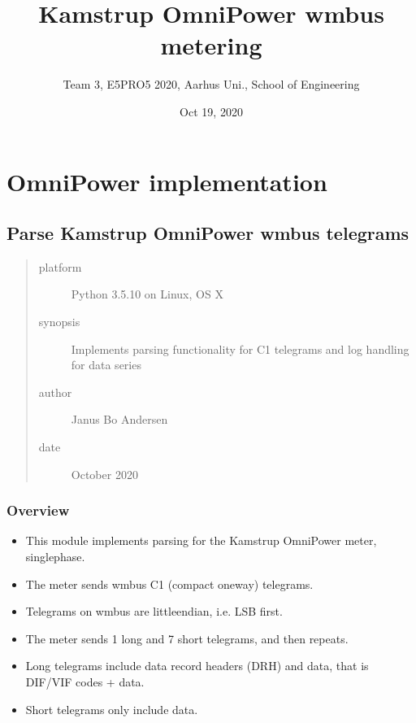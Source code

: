 \documentclass[letterpaper,10pt,english]{sphinxmanual}
\title{Kamstrup OmniPower wm\sphinxhyphen{}bus metering}
\date{Oct 19, 2020}
\author{Team 3, E5PRO5 2020, Aarhus Uni., School of Engineering}
\begin{document}
\pagestyle{empty}
\sphinxmaketitle
\pagestyle{plain}
\sphinxtableofcontents
\pagestyle{normal}
\label{\detokenize{index::doc}}



\chapter{OmniPower implementation}
\label{\detokenize{omnipower:module-OmniPower.OmniPower}}\label{\detokenize{omnipower:omnipower-implementation}}\label{\detokenize{omnipower::doc}}

\section{Parse Kamstrup OmniPower wm\sphinxhyphen{}bus telegrams}
\label{\detokenize{omnipower:parse-kamstrup-omnipower-wm-bus-telegrams}}\begin{quote}\begin{description}
\item[{platform}] \leavevmode
Python 3.5.10 on Linux, OS X

\item[{synopsis}] \leavevmode
Implements parsing functionality for C1 telegrams and log handling for data series

\item[{author}] \leavevmode
Janus Bo Andersen

\item[{date}]  October 2020

\end{description}\end{quote}


\subsection{Overview}
\label{\detokenize{omnipower:overview}}\begin{itemize}
\item {} 
This module implements parsing for the Kamstrup OmniPower meter, single\sphinxhyphen{}phase.

\item {} 
The meter sends wm\sphinxhyphen{}bus C1 (compact one\sphinxhyphen{}way) telegrams.

\item {} 
Telegrams on wm\sphinxhyphen{}bus are little\sphinxhyphen{}endian, i.e. LSB first.

\item {} 
The meter sends 1 long and 7 short telegrams, and then repeats.

\item {} 
Long telegrams include data record headers (DRH) and data, that is DIF/VIF codes + data.

\item {} 
Short telegrams only include data.

\end{itemize}
\end{document}
